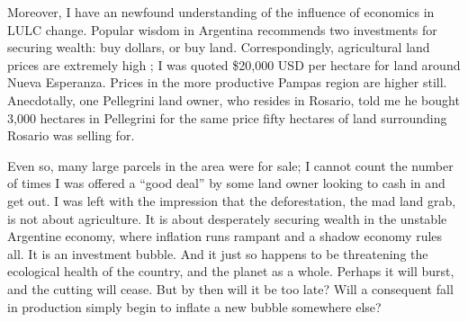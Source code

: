 Moreover, I have an newfound understanding of the influence of economics in LULC change. Popular wisdom in Argentina recommends two investments for securing wealth: buy dollars, or buy land. Correspondingly, agricultural land prices are extremely high \autocite{mercopress2010prime}; I was quoted \$20,000 USD per hectare for land around Nueva Esperanza. Prices in the more productive Pampas region are higher still. Anecdotally, one Pellegrini land owner, who resides in Rosario, told me he bought 3,000 hectares in Pellegrini for the same price fifty hectares of land surrounding Rosario was selling for.

Even so, many large parcels in the area were for sale; I cannot count the number of times I was offered a ``good deal'' by some land owner looking to cash in and get out. I was left with the impression that the deforestation, the mad land grab, is not about agriculture. It is about desperately securing wealth in the unstable Argentine economy, where inflation runs rampant and a shadow economy rules all. It is an investment bubble. And it just so happens to be threatening the ecological health of the country, and the planet as a whole. Perhaps it will burst, and the cutting will cease. But by then will it be too late? Will a consequent fall in production simply begin to inflate a new bubble somewhere else?











